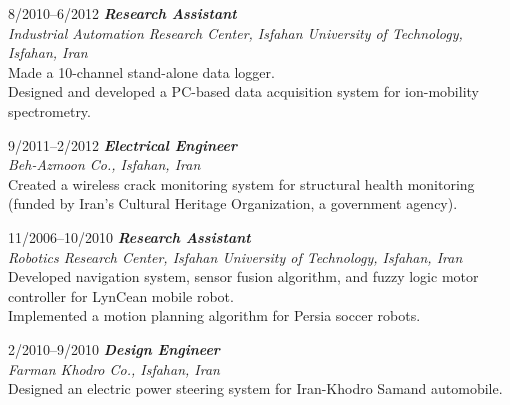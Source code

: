 \documentclass[10pt]{article}
\newlength{\Vspace}
\newlength{\Vspace}
\begin{document}
\begin{CV}
\item[8/2010--6/2012] \textbf{\textit{Research Assistant}} \\
    \textit{Industrial Automation Research Center, Isfahan University of Technology, Isfahan, Iran}\vspace{\Vspace} \\
    Made a 10-channel stand-alone data logger. \\
    Designed and developed a PC-based data acquisition system for ion-mobility spectrometry.

\item[9/2011--2/2012] \textbf{\textit{Electrical Engineer}} \\
    \textit{Beh-Azmoon Co., Isfahan, Iran}\vspace{\Vspace} \\
    Created a wireless crack monitoring system for structural health monitoring (funded by Iran's Cultural Heritage Organization, a government agency).

\item[11/2006--10/2010] \textbf{\textit{Research Assistant}} \\
    \textit{Robotics Research Center, Isfahan University of Technology, Isfahan, Iran}\vspace{\Vspace} \\
    Developed navigation system, sensor fusion algorithm, and fuzzy logic motor controller for LynCean mobile robot. \\
    Implemented a motion planning algorithm for Persia soccer robots.

\item[2/2010--9/2010] \textbf{\textit{Design Engineer}} \\
    \textit{Farman Khodro Co., Isfahan, Iran}\vspace{\Vspace} \\
    Designed an electric power steering system for Iran-Khodro Samand automobile.



\end{CV}
\end{document}

